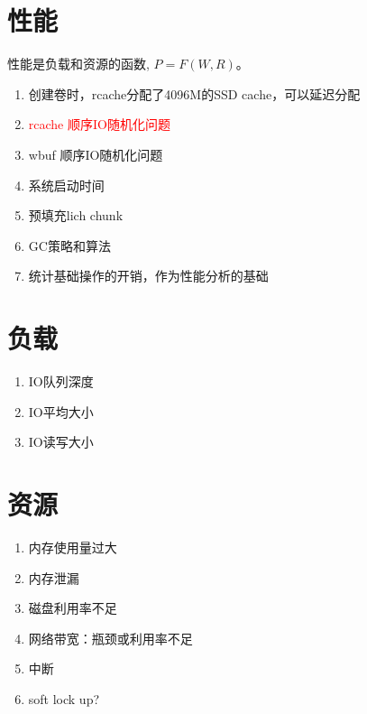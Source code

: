 \section{性能}

性能是负载和资源的函数, $P=F(W, R)$。

\begin{tcolorbox}
\begin{enumerate}
    \item 创建卷时，rcache分配了4096M的SSD cache，可以延迟分配
    \item \textcolor{red}{rcache 顺序IO随机化问题}
    \item wbuf 顺序IO随机化问题
    \item 系统启动时间
    \item 预填充lich chunk
    \item GC策略和算法
    \item 统计基础操作的开销，作为性能分析的基础
\end{enumerate}
\end{tcolorbox}

\section{负载}

\begin{tcolorbox}
\begin{enumerate}
    \item IO队列深度
    \item IO平均大小
    \item IO读写大小
\end{enumerate}
\end{tcolorbox}

\section{资源}

\begin{tcolorbox}
\begin{enumerate}
    \item 内存使用量过大
    \item 内存泄漏
    \item 磁盘利用率不足
    \item 网络带宽：瓶颈或利用率不足
    \item 中断
    \item soft lock up?
\end{enumerate}
\end{tcolorbox}

